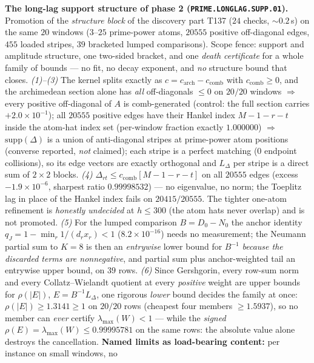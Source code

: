 \documentclass[11pt,a4paper]{article}
\begin{document}
\par\smallskip\noindent\textbf{The long-lag support structure of phase 2
(\texttt{PRIME.LONGLAG.SUPP.01}).}
Promotion of the \emph{structure block} of the discovery part T137 ($24$ checks,
${\sim}0.2$\,s) on the same $20$ windows ($3$--$25$ prime-power atoms, $20555$
positive off-diagonal edges, $455$ loaded stripes, $39$ bracketed lumped
comparisons). Scope fence: support and amplitude structure, one two-sided
bracket, and one \emph{death certificate} for a whole family of bounds --- no
fit, no decay exponent, and \emph{no} structure bound that closes.
\emph{(1)--(3)} The kernel splits exactly as
$c=c_{\mathrm{arch}}-c_{\mathrm{comb}}$ with $c_{\mathrm{comb}}\ge0$, and the
archimedean section alone has \emph{all} off-diagonals $\le0$ on $20/20$ windows
$\Rightarrow$ every positive off-diagonal of $A$ is comb-generated (control: the
full section carries $+2.0\times10^{-1}$); all $20555$ positive edges have their
Hankel index $M-1-r-t$ inside the atom-hat index set (per-window fraction exactly
$1.000000$) $\Rightarrow$ $\mathrm{supp}(\Delta)$ is a union of anti-diagonal
stripes at prime-power atom positions (converse reported, \emph{not} claimed);
each stripe is a perfect matching ($0$ endpoint collisions), so its edge vectors
are exactly orthogonal and $L_\Delta$ per stripe is a direct sum of $2\times2$
blocks.
\emph{(4)} $\Delta_{rt}\le c_{\mathrm{comb}}[M-1-r-t]$ on all $20555$ edges
(excess $-1.9\times10^{-6}$, sharpest ratio $0.99998532$) --- no eigenvalue, no
norm; the Toeplitz lag in place of the Hankel index fails on $20415/20555$. The
tighter one-atom refinement is \emph{honestly undecided} at $h\le300$ (the atom
hats never overlap) and is not promoted.
\emph{(5)} For the lumped comparison $B=D_0-N_0$ the anchor identity
$q_J=1-\min_r1/(d_rx_r)<1$ ($8.2\times10^{-16}$) needs no measurement; the
Neumann partial sum to $K=8$ is then an \emph{entrywise} lower bound for $B^{-1}$
\emph{because the discarded terms are nonnegative}, and partial sum plus
anchor-weighted tail an entrywise upper bound, on $39$ rows.
\emph{(6)} Since Gershgorin, every row-sum norm and every Collatz--Wielandt
quotient at every \emph{positive} weight are upper bounds for $\rho(|E|)$,
$E=B^{-1}L_\Delta$, one rigorous \emph{lower} bound decides the family at once:
$\rho(|E|)\ge1.3141\ge1$ on $20/20$ rows (cheapest four members $\ge1.5937$), so
no member can \emph{ever} certify $\lambda_{\max}(W)<1$ --- while the
\emph{signed} $\rho(E)=\lambda_{\max}(W)\le0.99995781$ on the same rows: the
absolute value alone destroys the cancellation.
\textbf{Named limits as load-bearing content:} per instance on small windows, no
\end{document}
